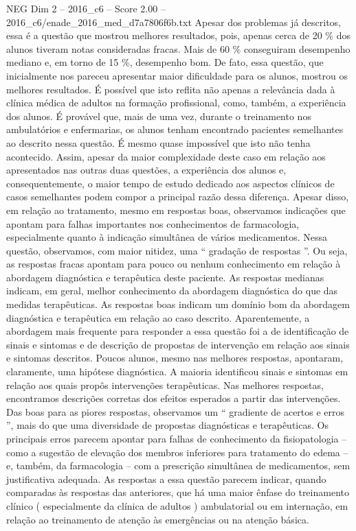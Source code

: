 \begin{textsample}{NEG Dim 2 – 2016\_c6 – Score 2.00 – 2016\_c6/enade\_2016\_med\_d7a7806f6b.txt}
Apesar dos problemas já descritos, essa é a questão que mostrou melhores resultados, pois, apenas cerca de 20 \% dos alunos tiveram notas consideradas fracas.
Mais de 60 \% conseguiram desempenho mediano e, em torno de 15 \%, desempenho bom.
De fato, essa questão, que inicialmente nos pareceu apresentar maior dificuldade para os alunos, mostrou os melhores resultados.
É possível que isto reflita não apenas a relevância dada à clínica médica de adultos na formação profissional, como, também, a experiência dos alunos.
É provável que, mais de uma vez, durante o treinamento nos ambulatórios e enfermarias, os alunos tenham encontrado pacientes semelhantes ao descrito nessa questão.
É mesmo quase impossível que isto não tenha acontecido.
Assim, apesar da maior complexidade deste caso em relação aos apresentados nas outras duas questões, a experiência dos alunos e, consequentemente, o maior tempo de estudo dedicado aos aspectos clínicos de casos semelhantes podem compor a principal razão dessa diferença.
Apesar disso, em relação ao tratamento, mesmo em respostas boas, observamos indicações que apontam para falhas importantes nos conhecimentos de farmacologia, especialmente quanto à indicação simultânea de vários medicamentos.
Nessa questão, observamos, com maior nitidez, uma “ gradação de respostas ”.
Ou seja, as respostas fracas apontam para pouco ou nenhum conhecimento em relação à abordagem diagnóstica e terapêutica deste paciente.
As respostas medianas indicam, em geral, melhor conhecimento da abordagem diagnóstica do que das medidas terapêuticas.
As respostas boas indicam um domínio bom da abordagem diagnóstica e terapêutica em relação ao caso descrito.
Aparentemente, a abordagem mais frequente para responder a essa questão foi a de identificação de sinais e sintomas e de descrição de propostas de intervenção em relação aos sinais e sintomas descritos.
Poucos alunos, mesmo nas melhores respostas, apontaram, claramente, uma hipótese diagnóstica.
A maioria identificou sinais e sintomas em relação aos quais propôs intervenções terapêuticas.
Nas melhores respostas, encontramos descrições corretas dos efeitos esperados a partir das intervenções.
Das boas para as piores respostas, observamos um “ gradiente de acertos e erros ”, mais do que uma diversidade de propostas diagnósticas e terapêuticas.
Os principais erros parecem apontar para falhas de conhecimento da fisiopatologia – como a sugestão de elevação dos membros inferiores para tratamento do edema – e, também, da farmacologia – com a prescrição simultânea de medicamentos, sem justificativa adequada.
As respostas a essa questão parecem indicar, quando comparadas às respostas das anteriores, que há uma maior ênfase do treinamento clínico ( especialmente da clínica de adultos ) ambulatorial ou em internação, em relação ao treinamento de atenção às emergências ou na atenção básica.

\end{textsample}
